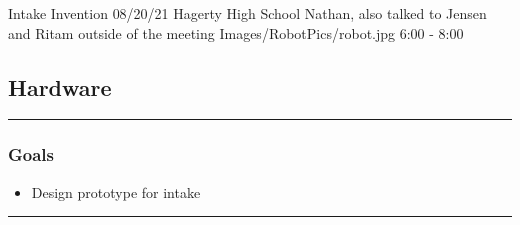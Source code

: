 \insertmeeting 
	{Intake Invention} 
	{08/20/21}
	{Hagerty High School}
	{Nathan, also talked to Jensen and Ritam outside of the meeting}
	{Images/RobotPics/robot.jpg}
	{6:00 - 8:00}
	
\subsection*{Hardware}
\noindent\hfil\rule{\textwidth}{.4pt}\hfil
\subsubsection*{Goals}
\begin{itemize}
    \item Design prototype for intake

\end{itemize} 

\noindent\hfil\rule{\textwidth}{.4pt}\hfil

